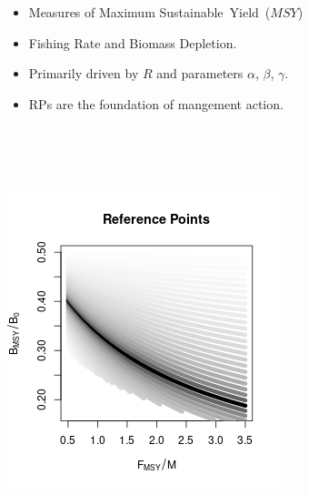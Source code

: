 \documentclass[a0paper,portrait]{baposter}
\begin{document}
\begin{poster}
{\begin{minipage}[h!]{0.55\textwidth}
        \begin{minipage}[b]{0.5\textwidth}
	\begin{itemize}[leftmargin=*]
		\raggedright
		\item Measures of Maximum \mbox{Sustainable Yield ($MSY$)}
		\item Fishing Rate and Biomass Depletion. %
		\item Primarily driven by $R$ and parameters $\alpha$, $\beta$, $\gamma$.
                \item RPs are the foundation of mangement action.
        \end{itemize}
	$~$\\$~$\\$~$\\
	\end{minipage}
        \begin{minipage}[b]{0.48\textwidth}
	\includegraphics[width=\textwidth]{../../ddBias/rpCurves.png} %

\end{minipage}
\end{minipage}}
\end{poster}
\end{document}
